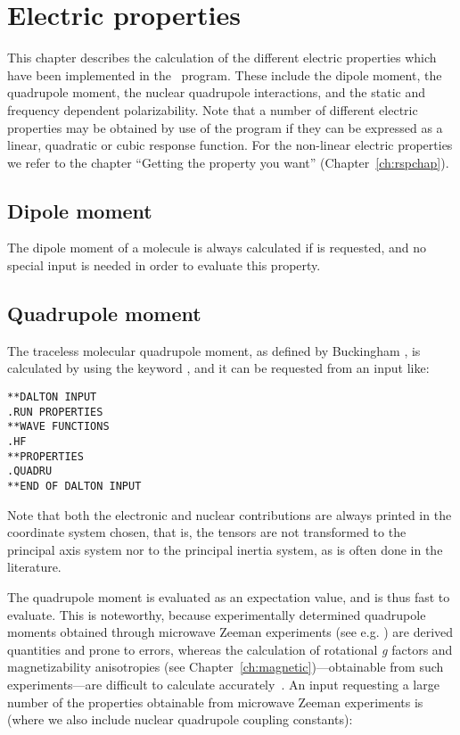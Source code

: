 \chapter{Electric properties}\label{ch:electric}

This chapter describes the calculation of the different electric
properties which have been implemented in the \dalton\ program.
These include the dipole moment, the quadrupole
moment, the nuclear quadrupole
interactions, and the static and frequency dependent
polarizability. Note that a number of different electric
properties may be
obtained by use of the {\resp} program if they can be expressed as a
linear, quadratic or cubic response function. For the non-linear
electric properties we refer to the chapter ``Getting the property you
want'' (Chapter~\ref{ch:rspchap}).

\section{Dipole moment}\label{sec:dipmom}

The dipole moment of a  molecule is always
calculated if  is
requested, and no special input is needed in order to evaluate this property.

\section{Quadrupole moment}\label{sec:quadmom}

The traceless molecular quadrupole moment, as
defined by Buckingham
\cite{adbacp12}, is calculated by using the keyword , and
it can be requested from an input like:

\begin{verbatim}
**DALTON INPUT
.RUN PROPERTIES
**WAVE FUNCTIONS
.HF
**PROPERTIES
.QUADRU
**END OF DALTON INPUT
\end{verbatim}

Note that both the electronic and nuclear contributions are always
printed in the coordinate system chosen, that is, the tensors are not
transformed to the principal axis system nor to the principal inertia
system, as is often done in the literature.

The quadrupole moment is evaluated as an expectation value, and is
thus fast to evaluate. This is noteworthy, because experimentally
determined quadrupole moments obtained through microwave Zeeman experiments
(see e.g.  \cite{whmklwhfjcp48,jsdhszna46}) are derived
quantities and prone to errors,
whereas the calculation of rotational {\em g} factors and magnetizability
anisotropies (see Chapter~\ref{ch:magnetic})---obtainable from such
experiments---are difficult to calculate accurately~\cite{krthcpl264}. An input
requesting a large number of the properties obtainable from microwave
Zeeman experiments is (where we also include nuclear quadrupole
coupling constants):

